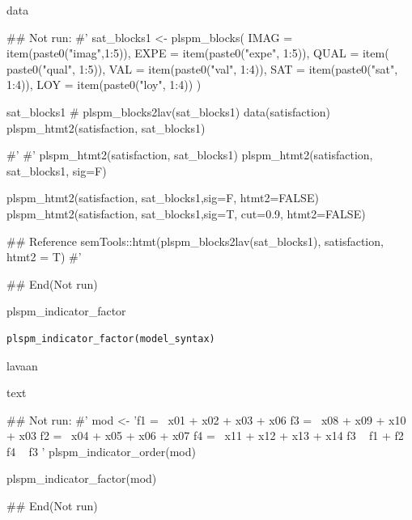 \documentclass[a4paper]{book}
\begin{document}
%
\begin{Value}
data
\end{Value}
%
\begin{Examples}
\begin{ExampleCode}

## Not run: 
#'
sat_blocks1 <- plspm_blocks(
  IMAG = item(paste0("imag",1:5)),
  EXPE = item(paste0("expe", 1:5)),
  QUAL = item( paste0("qual", 1:5)),
  VAL = item(paste0("val", 1:4)),
  SAT = item(paste0("sat", 1:4)),
  LOY = item(paste0("loy", 1:4))
)

sat_blocks1
# plspm_blocks2lav(sat_blocks1) %
data(satisfaction)
plspm_htmt2(satisfaction, sat_blocks1)

#'
#'
plspm_htmt2(satisfaction, sat_blocks1)
plspm_htmt2(satisfaction, sat_blocks1, sig=F)

plspm_htmt2(satisfaction, sat_blocks1,sig=F, htmt2=FALSE)
plspm_htmt2(satisfaction, sat_blocks1,sig=T, cut=0.9, htmt2=FALSE)

## Reference
semTools::htmt(plspm_blocks2lav(sat_blocks1),
               satisfaction,
               htmt2 = T)
#'


## End(Not run)

\end{ExampleCode}
\end{Examples}
%
\begin{Description}
plspm\_indicator\_factor
\end{Description}
%
\begin{Usage}
\begin{verbatim}
plspm_indicator_factor(model_syntax)
\end{verbatim}
\end{Usage}
%
\begin{Arguments}
\begin{ldescription}
\item[\code{model\_syntax}] lavaan
\end{ldescription}
\end{Arguments}
%
\begin{Value}
text
\end{Value}
%
\begin{Examples}
\begin{ExampleCode}

## Not run: 
#'
mod <-
  'f1 =~ x01 + x02 + x03 + x06
    f3 =~ x08 + x09 + x10 + x03
    f2 =~ x04 + x05 + x06 + x07
    f4 =~ x11 + x12 + x13 + x14
    f3 ~ f1 + f2
    f4 ~ f3
   '
plspm_indicator_order(mod)

plspm_indicator_factor(mod)

## End(Not run)

\end{ExampleCode}
\end{Examples}
\end{document}
